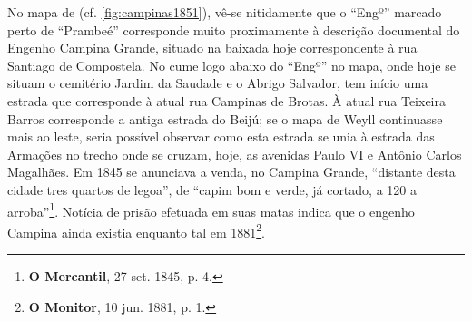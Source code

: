No mapa de  (cf. \autoref{fig:campinas1851}), vê-se nitidamente que o ``Engº'' marcado perto de ``Prambeé'' corresponde muito proximamente à descrição documental do Engenho Campina Grande, situado na baixada hoje correspondente à rua Santiago de Compostela. No cume logo abaixo do ``Engº'' no mapa, onde hoje se situam  o cemitério Jardim da Saudade e o Abrigo Salvador, tem início uma estrada que corresponde à atual rua Campinas de Brotas. À atual rua Teixeira Barros corresponde a antiga estrada do Beijú; se o mapa de Weyll continuasse mais ao leste, seria possível observar como esta estrada se unia à estrada das Armações no trecho onde se cruzam, hoje, as avenidas Paulo VI e Antônio Carlos Magalhães. Em 1845 se anunciava a venda, no Campina Grande, ``distante desta cidade tres quartos de legoa'', de ``capim bom e verde, já cortado, a 120 a arroba''\footnote{\textbf{O Mercantil}, 27 set. 1845, p. 4.}. Notícia de prisão efetuada em suas matas indica que o engenho Campina ainda existia enquanto tal em 1881\footnote{\textbf{O Monitor}, 10 jun. 1881, p. 1.}.

